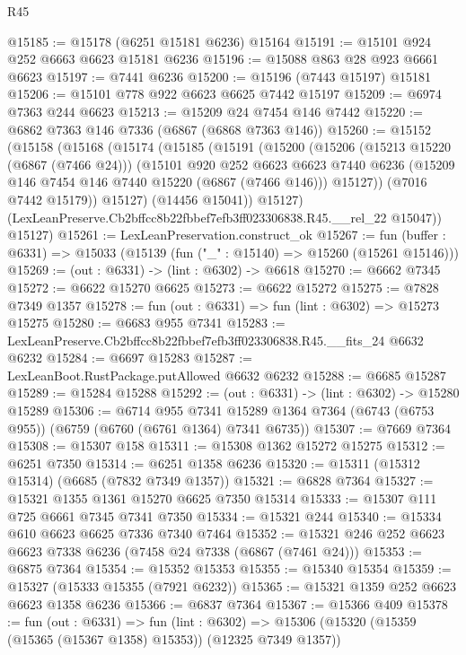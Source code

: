 \begin{lexlean}{R45}
\begin{coremodule}
{@15185 := @15178 (@6251 @15181 @6236) @15164
@15191 := @15101 @924 @252 @6663 @6623 @15181 @6236
@15196 := @15088 @863 @28 @923 @6661 @6623
@15197 := @7441 @6236
@15200 := @15196 (@7443 @15197) @15181
@15206 := @15101 @778 @922 @6623 @6625 @7442 @15197
@15209 := @6974 @7363 @244 @6623
@15213 := @15209 @24 @7454 @146 @7442
@15220 := @6862 @7363 @146 @7336 (@6867 (@6868 @7363 @146))
@15260 := @15152
    (@15158
      (@15168
        (@15174
          (@15185
            (@15191
              (@15200
                (@15206
                  (@15213 @15220 (@6867 (@7466 @24)))
                  (@15101
                    @920
                    @252
                    @6623
                    @6623
                    @7440
                    @6236
                    (@15209 @146 @7454 @146 @7440 @15220 (@6867 (@7466 @146)))
                    @15127))
                (@7016 @7442 @15179))
              @15127)
            (@14456 @15041))
          @15127)
        (LexLeanPreserve.Cb2bffcc8b22fbbef7efb3ff023306838.R45.__rel_22 @15047))
      @15127)
@15261 := LexLeanPreservation.construct_ok
@15267 := fun (buffer : @6331) => @15033 (@15139 (fun ("_" : @15140) => @15260 (@15261 @15146)))
@15269 := (out : @6331) -> (lint : @6302) -> @6618
@15270 := @6662 @7345
@15272 := @6622 @15270 @6625
@15273 := @6622 @15272
@15275 := @7828 @7349 @1357
@15278 := fun (out : @6331) => fun (lint : @6302) => @15273 @15275
@15280 := @6683 @955 @7341
@15283 := LexLeanPreserve.Cb2bffcc8b22fbbef7efb3ff023306838.R45.__fits_24 @6632 @6232
@15284 := @6697 @15283
@15287 := LexLeanBoot.RustPackage.putAllowed @6632 @6232
@15288 := @6685 @15287
@15289 := @15284 @15288
@15292 := (out : @6331) -> (lint : @6302) -> @15280 @15289
@15306 := @6714
    @955
    @7341
    @15289
    @1364
    @7364
    (@6743 (@6753 @955))
    (@6759 (@6760 (@6761 @1364) @7341 @6735))
@15307 := @7669 @7364
@15308 := @15307 @158
@15311 := @15308 @1362 @15272 @15275
@15312 := @6251 @7350
@15314 := @6251 @1358 @6236
@15320 := @15311 (@15312 @15314) (@6685 (@7832 @7349 @1357))
@15321 := @6828 @7364
@15327 := @15321 @1355 @1361 @15270 @6625 @7350 @15314
@15333 := @15307 @111 @725 @6661 @7345 @7341 @7350
@15334 := @15321 @244
@15340 := @15334 @610 @6623 @6625 @7336 @7340 @7464
@15352 := @15321 @246 @252 @6623 @6623 @7338 @6236 (@7458 @24 @7338 (@6867 (@7461 @24)))
@15353 := @6875 @7364
@15354 := @15352 @15353
@15355 := @15340 @15354
@15359 := @15327 (@15333 @15355 (@7921 @6232))
@15365 := @15321 @1359 @252 @6623 @6623 @1358 @6236
@15366 := @6837 @7364
@15367 := @15366 @409
@15378 := fun (out : @6331) =>
  fun (lint : @6302) => @15306 (@15320 (@15359 (@15365 (@15367 @1358) @15353)) (@12325 @7349 @1357))
}
\end{coremodule}
\end{lexlean}
